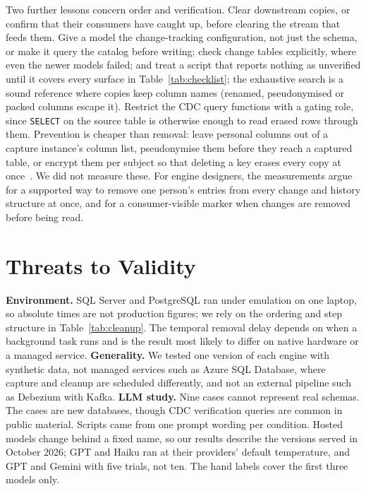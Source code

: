 \documentclass[runningheads]{llncs}
\begin{document}
Two further lessons concern order and verification. Clear downstream copies, or
confirm that their consumers have caught up, before clearing the stream that
feeds them. Give a model the change-tracking configuration, not just the
schema, or make it query the catalog before writing; check change tables
explicitly, where even the newer models failed; and treat a script that reports
nothing as unverified until it covers
every surface in Table~\ref{tab:checklist}; the exhaustive search is a sound
reference where copies keep column names (renamed, pseudonymised or packed
columns escape it). Restrict the CDC query functions with a gating role, since
\texttt{SELECT} on the source table is otherwise enough to read erased rows
through them. Prevention is cheaper than removal: leave personal columns out of a capture
instance's column list, pseudonymise them before they reach a captured table,
or encrypt them per subject so that deleting a key erases every copy at
once~\cite{verraes2019}. We did not measure these. For engine designers, the
measurements argue for a supported way
to remove one person's entries from every change and history structure at once,
and for a consumer-visible marker when changes are removed before being read.

\section{Threats to Validity}

\textbf{Environment.} SQL Server and PostgreSQL ran under emulation on one
laptop, so absolute times are not production figures; we rely on the ordering
and step structure in Table~\ref{tab:cleanup}. The temporal removal delay
depends on when a background task runs and is the result most likely to differ
on native hardware or a managed service. \textbf{Generality.} We tested one version of
each engine with synthetic data, not managed services such as Azure SQL
Database, where capture and cleanup are scheduled differently, and not an
external pipeline such as Debezium with Kafka. \textbf{LLM study.} Nine cases cannot represent real schemas. The cases
are new databases, though CDC verification queries are common in public
material. Scripts came from one prompt wording per condition. Hosted models change behind a fixed name, so our
results describe the versions served in October 2026; GPT and Haiku ran at their
providers' default temperature, and GPT and Gemini with five trials, not ten.
The hand labels cover the first three models only.
\end{document}
